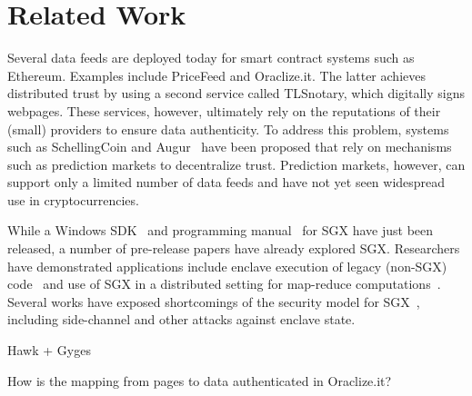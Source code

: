 \section{Related Work}
\label{sec:related}
Several data feeds are deployed today for smart contract systems such as Ethereum. Examples include PriceFeed and Oraclize.it. The latter achieves distributed trust by using a second service called TLSnotary, which digitally signs webpages. These services, however, ultimately rely on the reputations of their (small) providers to ensure data authenticity.  To address this problem, systems such as SchellingCoin and Augur~\cite{} have been proposed that rely on mechanisms such as prediction markets to decentralize trust. Prediction markets, however, can support only a limited number of data feeds and have not yet seen widespread use in cryptocurrencies. 

While a Windows SDK~\cite{} and programming manual~\cite{} for SGX have just been released, a number of pre-release papers have already explored SGX. Researchers have demonstrated applications include enclave execution of legacy (non-SGX) code~\cite{Haven} and use of SGX in a distributed setting for map-reduce computations~\cite{VC3}. Several works have exposed shortcomings of the security model for SGX~\cite{}, including side-channel and other attacks against enclave state. 

Hawk + Gyges

How is the mapping from pages to data authenticated in Oraclize.it?
